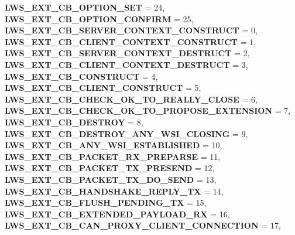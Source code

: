 \begin{DoxyCompactItemize}
{\bfseries L\+W\+S\+\_\+\+E\+X\+T\+\_\+\+C\+B\+\_\+\+O\+P\+T\+I\+O\+N\+\_\+\+S\+ET} = 24, 
{\bfseries L\+W\+S\+\_\+\+E\+X\+T\+\_\+\+C\+B\+\_\+\+O\+P\+T\+I\+O\+N\+\_\+\+C\+O\+N\+F\+I\+RM} = 25, 
\newline
{\bfseries L\+W\+S\+\_\+\+E\+X\+T\+\_\+\+C\+B\+\_\+\+S\+E\+R\+V\+E\+R\+\_\+\+C\+O\+N\+T\+E\+X\+T\+\_\+\+C\+O\+N\+S\+T\+R\+U\+CT} = 0, 
{\bfseries L\+W\+S\+\_\+\+E\+X\+T\+\_\+\+C\+B\+\_\+\+C\+L\+I\+E\+N\+T\+\_\+\+C\+O\+N\+T\+E\+X\+T\+\_\+\+C\+O\+N\+S\+T\+R\+U\+CT} = 1, 
{\bfseries L\+W\+S\+\_\+\+E\+X\+T\+\_\+\+C\+B\+\_\+\+S\+E\+R\+V\+E\+R\+\_\+\+C\+O\+N\+T\+E\+X\+T\+\_\+\+D\+E\+S\+T\+R\+U\+CT} = 2, 
{\bfseries L\+W\+S\+\_\+\+E\+X\+T\+\_\+\+C\+B\+\_\+\+C\+L\+I\+E\+N\+T\+\_\+\+C\+O\+N\+T\+E\+X\+T\+\_\+\+D\+E\+S\+T\+R\+U\+CT} = 3, 
\newline
{\bfseries L\+W\+S\+\_\+\+E\+X\+T\+\_\+\+C\+B\+\_\+\+C\+O\+N\+S\+T\+R\+U\+CT} = 4, 
{\bfseries L\+W\+S\+\_\+\+E\+X\+T\+\_\+\+C\+B\+\_\+\+C\+L\+I\+E\+N\+T\+\_\+\+C\+O\+N\+S\+T\+R\+U\+CT} = 5, 
{\bfseries L\+W\+S\+\_\+\+E\+X\+T\+\_\+\+C\+B\+\_\+\+C\+H\+E\+C\+K\+\_\+\+O\+K\+\_\+\+T\+O\+\_\+\+R\+E\+A\+L\+L\+Y\+\_\+\+C\+L\+O\+SE} = 6, 
{\bfseries L\+W\+S\+\_\+\+E\+X\+T\+\_\+\+C\+B\+\_\+\+C\+H\+E\+C\+K\+\_\+\+O\+K\+\_\+\+T\+O\+\_\+\+P\+R\+O\+P\+O\+S\+E\+\_\+\+E\+X\+T\+E\+N\+S\+I\+ON} = 7, 
\newline
{\bfseries L\+W\+S\+\_\+\+E\+X\+T\+\_\+\+C\+B\+\_\+\+D\+E\+S\+T\+R\+OY} = 8, 
{\bfseries L\+W\+S\+\_\+\+E\+X\+T\+\_\+\+C\+B\+\_\+\+D\+E\+S\+T\+R\+O\+Y\+\_\+\+A\+N\+Y\+\_\+\+W\+S\+I\+\_\+\+C\+L\+O\+S\+I\+NG} = 9, 
{\bfseries L\+W\+S\+\_\+\+E\+X\+T\+\_\+\+C\+B\+\_\+\+A\+N\+Y\+\_\+\+W\+S\+I\+\_\+\+E\+S\+T\+A\+B\+L\+I\+S\+H\+ED} = 10, 
{\bfseries L\+W\+S\+\_\+\+E\+X\+T\+\_\+\+C\+B\+\_\+\+P\+A\+C\+K\+E\+T\+\_\+\+R\+X\+\_\+\+P\+R\+E\+P\+A\+R\+SE} = 11, 
\newline
{\bfseries L\+W\+S\+\_\+\+E\+X\+T\+\_\+\+C\+B\+\_\+\+P\+A\+C\+K\+E\+T\+\_\+\+T\+X\+\_\+\+P\+R\+E\+S\+E\+ND} = 12, 
{\bfseries L\+W\+S\+\_\+\+E\+X\+T\+\_\+\+C\+B\+\_\+\+P\+A\+C\+K\+E\+T\+\_\+\+T\+X\+\_\+\+D\+O\+\_\+\+S\+E\+ND} = 13, 
{\bfseries L\+W\+S\+\_\+\+E\+X\+T\+\_\+\+C\+B\+\_\+\+H\+A\+N\+D\+S\+H\+A\+K\+E\+\_\+\+R\+E\+P\+L\+Y\+\_\+\+TX} = 14, 
{\bfseries L\+W\+S\+\_\+\+E\+X\+T\+\_\+\+C\+B\+\_\+\+F\+L\+U\+S\+H\+\_\+\+P\+E\+N\+D\+I\+N\+G\+\_\+\+TX} = 15, 
\newline
{\bfseries L\+W\+S\+\_\+\+E\+X\+T\+\_\+\+C\+B\+\_\+\+E\+X\+T\+E\+N\+D\+E\+D\+\_\+\+P\+A\+Y\+L\+O\+A\+D\+\_\+\+RX} = 16, 
{\bfseries L\+W\+S\+\_\+\+E\+X\+T\+\_\+\+C\+B\+\_\+\+C\+A\+N\+\_\+\+P\+R\+O\+X\+Y\+\_\+\+C\+L\+I\+E\+N\+T\+\_\+\+C\+O\+N\+N\+E\+C\+T\+I\+ON} = 17, 

\end{DoxyCompactItemize}
